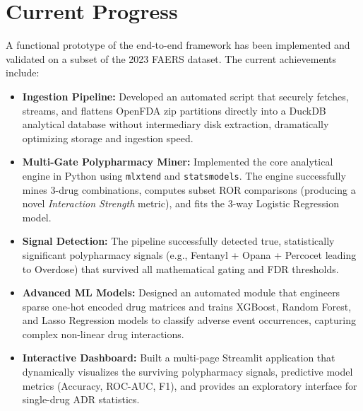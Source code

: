 \documentclass[11pt,a4paper]{article}
\begin{document}
\section*{Current Progress}
A functional prototype of the end-to-end framework has been implemented and validated on a subset of the 2023 FAERS dataset. The current achievements include:
\begin{itemize}
    \item \textbf{Ingestion Pipeline:} Developed an automated script that securely fetches, streams, and flattens OpenFDA zip partitions directly into a DuckDB analytical database without intermediary disk extraction, dramatically optimizing storage and ingestion speed.
    \item \textbf{Multi-Gate Polypharmacy Miner:} Implemented the core analytical engine in Python using \texttt{mlxtend} and \texttt{statsmodels}. The engine successfully mines 3-drug combinations, computes subset ROR comparisons (producing a novel \textit{Interaction Strength} metric), and fits the 3-way Logistic Regression model.
    \item \textbf{Signal Detection:} The pipeline successfully detected true, statistically significant polypharmacy signals (e.g., Fentanyl + Opana + Percocet leading to Overdose) that survived all mathematical gating and FDR thresholds.
    \item \textbf{Advanced ML Models:} Designed an automated module that engineers sparse one-hot encoded drug matrices and trains XGBoost, Random Forest, and Lasso Regression models to classify adverse event occurrences, capturing complex non-linear drug interactions.
    \item \textbf{Interactive Dashboard:} Built a multi-page Streamlit application that dynamically visualizes the surviving polypharmacy signals, predictive model metrics (Accuracy, ROC-AUC, F1), and provides an exploratory interface for single-drug ADR statistics.
\end{itemize}
\end{document}
